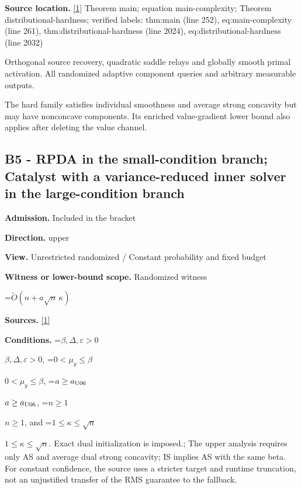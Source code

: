 \documentclass[10pt,a4paper]{article}
\newcommand{\AtlasMath}[1]{\par\begingroup\centering\setbox0=\hbox{$\displaystyle #1$}\ifdim\wd0>1.4\linewidth\typeout{ATLAS WIDE FORMULA: \the\wd0}\fi\ifdim\wd0>\linewidth\resizebox{\linewidth}{!}{\box0}\else\box0\fi\par\endgroup}
\newcommand{\AtlasInlineMath}[1]{\begingroup\setbox0=\hbox{$#1$}\ifdim\wd0>.4\linewidth\endgroup\AtlasMath{#1}\else\endgroup$#1$\fi}
\begin{document}
\textbf{Source location.} \href{https://github.com/WU-Wendao/Colombo/blob/main/colombo_sensorium/Complexity_altas/data/sources/colombo/U06/manuscript.pdf}{[1]} Theorem main; equation main-complexity; Theorem distributional-hardness; verified labels: thm:main (line 252), eq:main-complexity (line 261), thm:distributional-hardness (line 2024), eq:distributional-hardness (line 2032)



Orthogonal source recovery, quadratic saddle relays and globally smooth primal activation. All randomized adaptive component queries and arbitrary measurable outputs.



The hard family satisfies individual smoothness and average strong concavity but may have nonconcave components. Its enriched value-gradient lower bound also applies after deleting the value channel.



\subsection{B5 - RPDA in the small-condition branch; Catalyst with a variance-reduced inner solver in the large-condition branch}


\textbf{Admission.} Included in the bracket



\textbf{Direction.} upper



\textbf{View.} Unrestricted randomized / Constant probability and fixed budget



\textbf{Witness or lower-bound scope.} Randomized witness



\AtlasMath{\widetilde O(n+a\sqrt n\,\kappa)}


\textbf{Sources.} \href{https://github.com/WU-Wendao/Colombo/blob/main/colombo_sensorium/Complexity_altas/data/sources/colombo/U06/manuscript.pdf}{[1]}



\textbf{Conditions.} \AtlasInlineMath{\beta,\Delta,\varepsilon>0}, \AtlasInlineMath{0<\mu_y\le\beta}, \AtlasInlineMath{a\ge a_{\rm U06}}, \AtlasInlineMath{n\ge1}, and \AtlasInlineMath{1\le\kappa\le\sqrt n}. Exact dual initialization is imposed.; The upper analysis requires only AS and average dual strong concavity; IS implies AS with the same beta. For constant confidence, the source uses a stricter target and runtime truncation, not an unjustified transfer of the RMS guarantee to the fallback.
\end{document}
